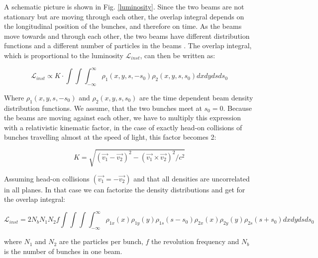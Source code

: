 A schematic picture is shown in Fig. \ref{luminosity}. Since the two beams are not stationary but are moving through each other, the overlap integral depends on the longitudinal position of the bunches, and therefore on time. As the beams move towards and through each other, the two beams have different distribution functions and a different number of particles in the beams \cite{concept_of_luminosity}. The overlap integral, which is proportional to the luminosity $\mathcal{L}_{inst}$, can then be written as:
 
\begin{equation}
  \mathcal{L}_{inst}\propto K\cdot \int\int \int_{-\infty}^{\infty} \rho_{1}(x,y,s,-s_{0}) \rho_{2}(x,y,s,s_{0})dxdydsds_{0}
    \label{lumi_1}
\end{equation}
 
Where  $\rho_{1}(x,y,s,-s_{0})$ and $\rho_{2}(x,y,s,s_{0})$ are the time dependent beam density distribution functions. We assume, that the two bunches meet at $s_{0} = 0$. Because the beams are moving against each other, we have to multiply this expression with a relativistic kinematic factor, in the case of exactly head-on collisions of bunches travelling almost at the speed of light, this factor becomes 2:

\begin{equation}
 K = \sqrt{(\vec{v_{1}}-\vec{v_{2}})^{2}-(\vec{v_{1}}\times \vec{v_{2}})^{2}/c^{2}}
    \label{kinematic}
\end{equation}

Assuming head-on collisions $( \vec{v_{1}}=-\vec{v_{2}} )$ and that all densities are uncorrelated in all planes. In that case we can factorize the density distributions and get for the overlap integral:

\begin{equation}
  \mathcal{L}_{inst}= 2N_{b} N_{1}N_{2}f \int\int\int\int_{-\infty}^{\infty}  \rho_{1x}(x)\rho_{1y}(y)\rho_{1s}(s-s_{0})\rho_{2x}(x)\rho_{2y}(y)\rho_{2s}(s+s_{0}) dxdydsds_{0}
    \label{luminosity_2}
\end{equation}

where $N_{1}$ and $N_{2}$ are the particles per bunch, $f$ the revolution frequency and $N_{b}$ is the number of bunches in one beam.\\




